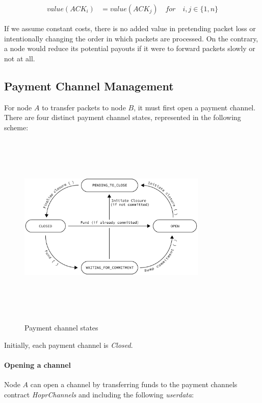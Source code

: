 \begin{align}
value ( ACK_i )  &  =value ( ACK_j ) \quad for \quad i,j\in \{1,n\}
\end{align}

If we assume constant costs, there is no added value in pretending
packet loss or intentionally changing the order in which packets are processed.
On the contrary, a node would reduce its potential payouts if it were to forward
packets slowly or not at all.

\subsection{Payment Channel Management}
\label{sec:paymentchannelmanagement}

For node $A$ to transfer packets to node $B$, it must first open a payment channel. There are
four distinct payment channel states, represented in the following
scheme:

\begin{figure}[H]
    \centering
    \includegraphics[width=9cm,height=9cm,keepaspectratio]{../yellowpaper/images/statesTransition.png}
    \label{fig:payment channel states}
    \caption{Payment channel states}
\end{figure}
Initially, each payment channel is \textit{Closed}. 

\paragraph{Opening a channel} Node $A$ can open a channel by transferring funds to
the payment channels contract \textit{HoprChannels} and including the following
\textit{userdata}:

